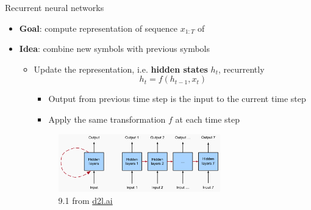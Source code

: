 \documentclass[usenames,dvipsnames,notes,11pt,aspectratio=169,hyperref={colorlinks=true, linkcolor=blue}]{beamer}
\newcommand{\pdfnote}[1]{}
\begin{document}
\begin{frame}
    {Recurrent neural networks}
    \begin{itemize}
        \item \textbf{Goal}: compute representation of sequence $x_{1:T}$ of 

        \item \textbf{Idea}: combine new symbols with previous symbols  %
            \pdfnote{Read the sequence from left to right, update the representation with each new word read}
    \pdfnote{
        RNN is a model for sequence data.
        We add a piece of new information at each time step.
    Specifically, we maintain a representation of the current state, which summarizes the context until the current time step.
    To compute the current state, we take the previous state and combine it with the new input.
    }

    \pause
    \begin{itemize}
        \item Update the representation, i.e. \textbf{hidden states} $h_t$, recurrently
    $$
    h_t = f(h_{t-1}, x_t)
    $$
    \vspace{-1em}
            \begin{itemize}
            \item Output from previous time step is the input to the current time step
            \item Apply the same transformation $f$ at each time step
            \end{itemize}
    \vspace{1em}
    \begin{figure}
        \includegraphics[height=2.5cm]{figures/rnn-concept}
        \caption{9.1 from \href{https://d2l.ai/chapter_recurrent-neural-networks}{d2l.ai}}
    \end{figure}
    \end{itemize}
    \end{itemize}

\end{frame}
\end{document}
